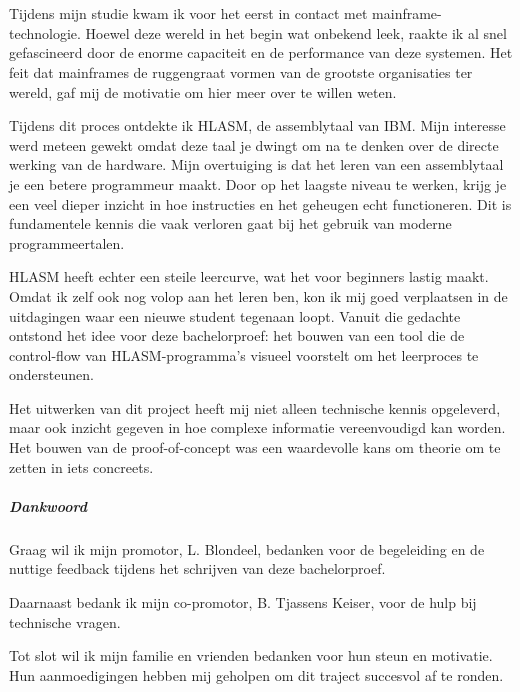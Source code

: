 
\chapter*{}%
\label{ch:voorwoord}




Tijdens mijn studie kwam ik voor het eerst in contact met mainframe-technologie. Hoewel deze wereld in het begin wat onbekend leek, raakte ik al snel gefascineerd door de enorme capaciteit en de performance van deze systemen. Het feit dat mainframes de ruggengraat vormen van de grootste organisaties ter wereld, gaf mij de motivatie om hier meer over te willen weten. 

Tijdens dit proces ontdekte ik HLASM, de assemblytaal van IBM. Mijn interesse werd meteen gewekt omdat deze taal je dwingt om na te denken over de directe werking van de hardware. Mijn overtuiging is dat het leren van een assemblytaal je een betere programmeur maakt. Door op het laagste niveau te werken, krijg je een veel dieper inzicht in hoe instructies en het geheugen echt functioneren. Dit is fundamentele kennis die vaak verloren gaat bij het gebruik van moderne programmeertalen.

HLASM heeft echter een steile leercurve, wat het voor beginners lastig maakt. Omdat ik zelf ook nog volop aan het leren ben, kon ik mij goed verplaatsen in de uitdagingen waar een nieuwe student tegenaan loopt. Vanuit die gedachte ontstond het idee voor deze bachelorproef: het bouwen van een tool die de control-flow van HLASM-programma's visueel voorstelt om het leerproces te ondersteunen.

Het uitwerken van dit project heeft mij niet alleen technische kennis opgeleverd, maar ook inzicht gegeven in hoe complexe informatie vereenvoudigd kan worden. Het bouwen van de proof-of-concept was een waardevolle kans om theorie om te zetten in iets concreets.

\paragraph{Dankwoord}

Graag wil ik mijn promotor, L. Blondeel, bedanken voor de begeleiding en de nuttige feedback tijdens het schrijven van deze bachelorproef.

Daarnaast bedank ik mijn co-promotor, B. Tjassens Keiser, voor de hulp bij technische vragen.

Tot slot wil ik mijn familie en vrienden bedanken voor hun steun en motivatie. Hun aanmoedigingen hebben mij geholpen om dit traject succesvol af te ronden.
